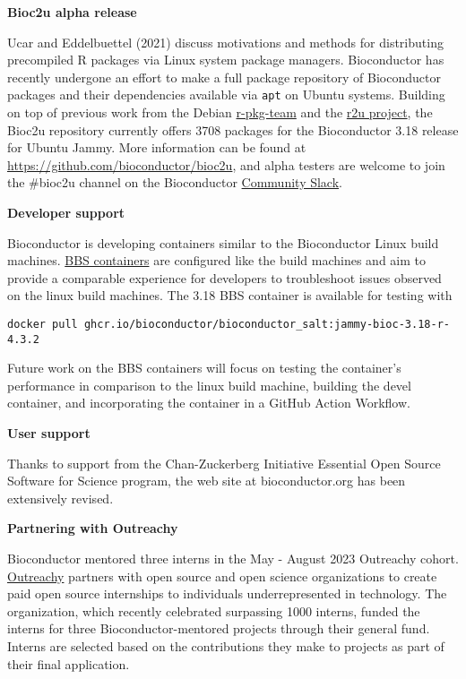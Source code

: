\textbf{Bioc2u alpha release}

Ucar and Eddelbuettel (2021) discuss motivations and methods for distributing precompiled R packages via
Linux system package managers.
Bioconductor has recently undergone an effort to make a full package repository of Bioconductor packages and their dependencies available via \texttt{apt} on Ubuntu systems. Building on top of previous work from the Debian \href{https://wiki.debian.org/Teams/r-pkg-team}{r-pkg-team} and the \href{https://github.com/eddelbuettel/r2u/}{r2u project}, the Bioc2u repository currently offers 3708 packages for the Bioconductor 3.18 release for Ubuntu Jammy. More information can be found at \url{https://github.com/bioconductor/bioc2u}, and alpha testers are welcome to join the \#bioc2u channel on the Bioconductor \href{community-bioc.slack.com}{Community Slack}.

\textbf{Developer support }

Bioconductor is developing containers similar to the Bioconductor Linux build machines. \href{https://github.com/Bioconductor/bioconductor_salt}{BBS containers} are configured like the build machines and aim to provide a comparable experience for developers to troubleshoot issues observed on the linux build machines. The 3.18 BBS container is available for testing with

\begin{verbatim}
docker pull ghcr.io/bioconductor/bioconductor_salt:jammy-bioc-3.18-r-4.3.2
\end{verbatim}

Future work on the BBS containers will focus on testing the container's performance
in comparison to the linux build machine, building the devel container, and
incorporating the container in a GitHub Action Workflow.

\textbf{User support}

Thanks to support from the Chan-Zuckerberg Initiative Essential Open Source Software
for Science program, the web site at bioconductor.org has been extensively revised.

\textbf{Partnering with Outreachy}

Bioconductor mentored three interns in the May - August 2023 Outreachy cohort. \href{outreachy.org}{Outreachy} partners with open source and open science organizations to create paid open source internships to individuals underrepresented in technology. The organization, which recently celebrated surpassing 1000 interns, funded the interns for three Bioconductor-mentored projects through their general fund. Interns are selected based on the contributions they make to projects as part of their final application.


